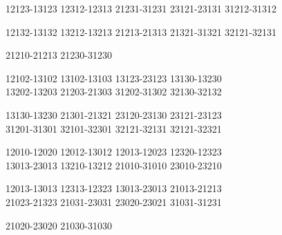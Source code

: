 \begingroup\footnotesize\ttfamily\begin{flushleft}
12123-13123 12312-12313 21231-31231 23121-23131 31212-31312\\
\end{flushleft}\endgroup
\begingroup\footnotesize\ttfamily\begin{flushleft}
12132-13132 13212-13213 21213-21313 21321-31321 32121-32131\\
\end{flushleft}\endgroup
\begingroup\footnotesize\ttfamily\begin{flushleft}
21210-21213 21230-31230\\
\end{flushleft}\endgroup
\begingroup\footnotesize\ttfamily\begin{flushleft}
12102-13102 13102-13103 13123-23123 13130-13230\\
13202-13203 21203-21303 31202-31302 32130-32132\\
\end{flushleft}\endgroup
\begingroup\footnotesize\ttfamily\begin{flushleft}
13130-13230 21301-21321 23120-23130 23121-23123\\
31201-31301 32101-32301 32121-32131 32121-32321\\
\end{flushleft}\endgroup
\begingroup\footnotesize\ttfamily\begin{flushleft}
12010-12020 12012-13012 12013-12023 12320-12323\\
13013-23013 13210-13212 21010-31010 23010-23210\\
\end{flushleft}\endgroup
\begingroup\footnotesize\ttfamily\begin{flushleft}
12013-13013 12313-12323 13013-23013 21013-21213\\
21023-21323 21031-23031 23020-23021 31031-31231\\
\end{flushleft}\endgroup
\begingroup\footnotesize\ttfamily\begin{flushleft}
21020-23020 21030-31030\\
\end{flushleft}\endgroup
